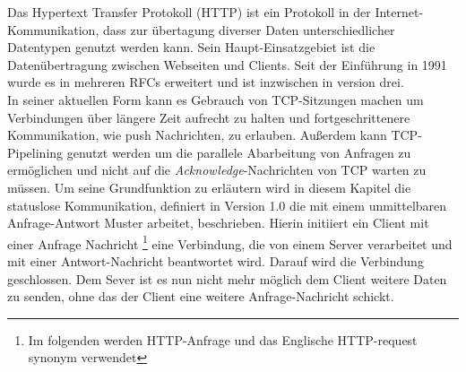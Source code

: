 %
% 
% 
% 
% 
% 
% 
% 

Das Hypertext Transfer Protokoll (HTTP) ist ein Protokoll in der Internet-Kommunikation, dass zur übertagung diverser Daten unterschiedlicher Datentypen genutzt werden kann. Sein Haupt-Einsatzgebiet ist die Datenübertragung zwischen Webseiten und Clients.
Seit der Einführung in 1991 wurde es in mehreren RFCs erweitert und ist inzwischen in version drei.\\

In seiner aktuellen Form kann es Gebrauch von TCP-Sitzungen machen um Verbindungen über längere Zeit aufrecht zu halten und fortgeschrittenere Kommunikation, wie push Nachrichten, zu erlauben. Außerdem kann TCP-Pipelining genutzt werden um die parallele Abarbeitung von Anfragen zu ermöglichen und nicht auf die \textit{Acknowledge}-Nachrichten von TCP warten zu müssen.
Um seine Grundfunktion zu erläutern wird in diesem Kapitel die statuslose Kommunikation, definiert in Version 1.0 die mit einem unmittelbaren Anfrage-Antwort Muster arbeitet, beschrieben.
Hierin initiiert ein Client mit einer Anfrage Nachricht \footnote{Im folgenden werden HTTP-Anfrage und das Englische HTTP-request synonym verwendet} eine Verbindung, die von einem Server verarbeitet und mit einer Antwort-Nachricht beantwortet wird. Darauf wird die Verbindung geschlossen.
Dem Sever ist es nun nicht mehr möglich dem Client weitere Daten zu senden, ohne das der Client eine weitere Anfrage-Nachricht schickt.

